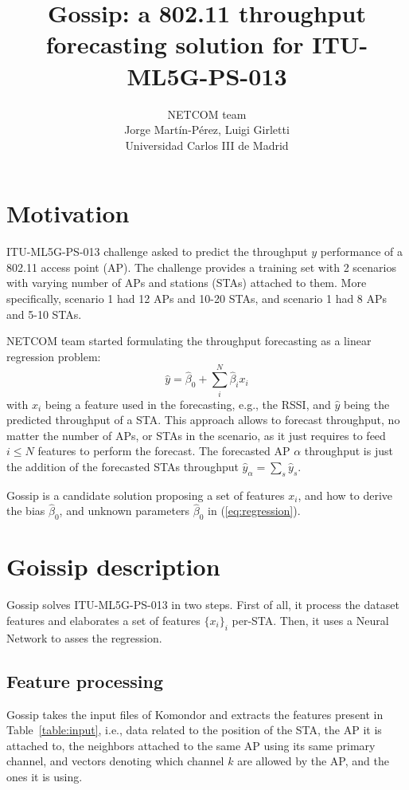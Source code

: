 \documentclass{article}
\title{Gossip: a 802.11 throughput\\forecasting solution for
ITU-ML5G-PS-013}
\author{NETCOM team\\
    Jorge Mart\'{i}n-P\'{e}rez,
Luigi Girletti\\
Universidad Carlos III de Madrid}
\date{}
\begin{document}
\maketitle


\section{Motivation}
ITU-ML5G-PS-013 challenge asked to predict the
throughput $y$ performance of a 802.11 access point
(AP). The challenge provides a training set with
2 scenarios with varying number of APs and
stations (STAs) attached to them. More specifically,
scenario 1 had 12 APs and 10-20 STAs, and
scenario 1 had 8 APs and 5-10 STAs.

NETCOM team started formulating the throughput
forecasting as a linear regression problem:
\begin{equation}
    \hat{y} = \hat{\beta}_0 + \sum_i^N \hat{\beta}_i x_i\label{eq:regression}
\end{equation}
with $x_i$ being a feature used in the forecasting,
e.g., the RSSI, and $\hat{y}$ being the predicted
throughput of a STA.
This approach allows to forecast throughput, no
matter the number of APs, or STAs in the scenario,
as it just requires to feed $i\le N$ features to
perform the forecast.
The forecasted AP $\alpha$ throughput is just the
addition of the forecasted STAs throughput
$\hat{y}_\alpha = \sum_s \hat{y}_s$.

Gossip is a candidate solution proposing a set
of features $x_i$, and how to derive
the bias $\hat{\beta}_0$, and unknown parameters
$\hat{\beta}_0$ in
(\ref{eq:regression}).

\section{Goissip description}
Gossip solves ITU-ML5G-PS-013 in two steps. First
of all, it process the dataset features and
elaborates a set of features $\{x_i\}_i$
per-STA. Then, it uses a Neural Network to
asses the regression.

\subsection{Feature processing}
Gossip takes the input files of Komondor and
extracts the features present in Table~\ref{table:input},
i.e., data related to the position of the STA,
the AP it is attached to, the neighbors attached to
the same AP using its same primary channel, and
vectors denoting which channel $k$ are allowed by
the AP, and the ones it is using.
\end{document}
